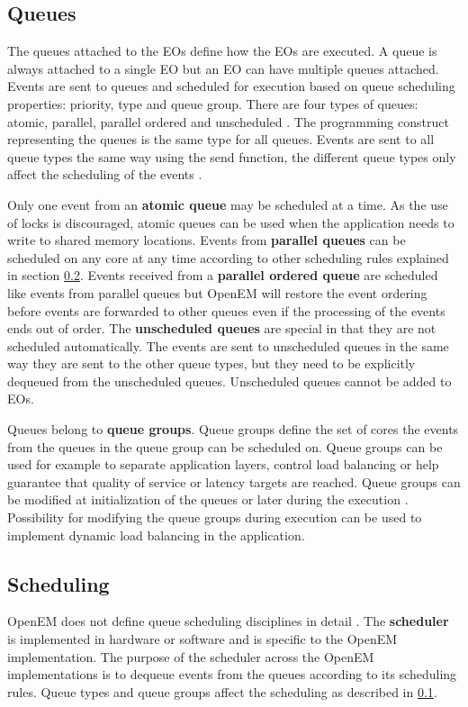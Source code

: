 \subsection{Queues}
\label{subsec:queues}
The queues attached to the EOs define how the EOs are executed. A queue is always attached to a single EO but an EO can have multiple queues attached. Events are sent to queues and scheduled for execution based on queue scheduling properties: priority, type and queue group. \cite{openemintro} There are four types of queues: atomic, parallel, parallel ordered and unscheduled \cite{openemintro}. The programming construct representing the queues is the same type for all queues. Events are sent to all queue types the same way using the send function, the different queue types only affect the scheduling of the events \cite{openemintro}.

Only one event from an \textbf{atomic queue} may be scheduled at a time. As the use of locks is discouraged, atomic queues can be used when the application needs to write to shared memory locations. Events from \textbf{parallel queues} can be scheduled on any core at any time according to other scheduling rules explained in section \ref{subsec:schedule}. Events received from a \textbf{parallel ordered queue} are scheduled like events from parallel queues but OpenEM will restore the event ordering before events are forwarded to other queues even if the processing of the events ends out of order. The \textbf{unscheduled queues} are special in that they are not scheduled automatically. The events are sent to unscheduled queues in the same way they are sent to the other queue types, but they need to be explicitly dequeued from the unscheduled queues. Unscheduled queues cannot be added to EOs. \cite{openempage}

Queues belong to \textbf{queue groups}. Queue groups define the set of cores the events from the queues in the queue group can be scheduled on. Queue groups can be used for example to separate application layers, control load balancing or help guarantee that quality of service or latency targets are reached. \cite{openemintro} Queue groups can be modified at initialization of the queues or later during the execution \cite{openempage}. Possibility for modifying the queue groups during execution can be used to implement dynamic load balancing in the application.

\subsection{Scheduling}
\label{subsec:schedule}
OpenEM does not define queue scheduling disciplines in detail \cite{openempage}. The \textbf{scheduler} is implemented in hardware or software and is specific to the OpenEM implementation. The purpose of the scheduler across the OpenEM implementations is to dequeue events from the queues according to its scheduling rules. \cite{openemintro} Queue types and queue groups affect the scheduling as described in \ref{subsec:queues}.  

